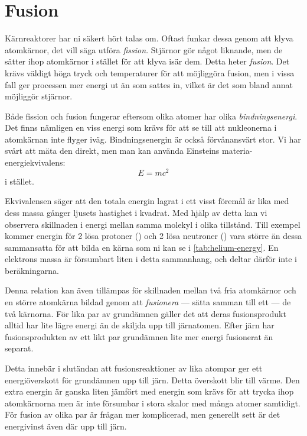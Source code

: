 \section{Fusion}
Kärnreaktorer har ni säkert hört talas om. Oftast funkar dessa genom att klyva atomkärnor, det vill säga utföra \emph{fission}. Stjärnor gör något liknande, men de sätter ihop atomkärnor i stället för att klyva isär dem. Detta heter \emph{fusion}. Det krävs väldigt höga tryck och temperaturer för att möjliggöra fusion, men i vissa fall ger processen mer energi ut än som sattes in, vilket är det som bland annat möjliggör stjärnor.

Både fission och fusion fungerar eftersom olika atomer har olika \emph{bindningsenergi}. Det finns nämligen en viss energi som krävs för att se till att nukleonerna i atomkärnan inte flyger iväg. Bindningsenergin är också förvånansvärt stor. Vi har svårt att mäta den direkt, men man kan använda Einsteins materia-energiekvivalens:
\begin{equation}
    E = mc^2
    \label{eq:emc2}
\end{equation}
i stället.

Ekvivalensen säger att den totala energin lagrat i ett visst föremål är lika med dess massa gånger ljusets hastighet i kvadrat. Med hjälp av detta kan vi observera skillnaden i energi mellan samma molekyl i olika tillstånd. Till exempel kommer energin för 2 lösa protoner () och 2 lösa neutroner () vara större än dessa sammansatta för att bilda en  kärna som ni kan se i \cref{tab:helium-energy}. En elektrons massa är försumbart liten i detta sammanhang, och deltar därför inte i beräkningarna.

Denna relation kan även tillämpas för skillnaden mellan två fria atomkärnor och en större atomkärna bildad genom att \emph{fusionera} --- sätta samman till ett --- de två kärnorna. För lika par av grundämnen gäller det att deras fusionsprodukt alltid har lite lägre energi än de skiljda upp till järnatomen. Efter järn har fusionsprodukten av ett likt par grundämnen lite mer energi fusionerat än separat.

Detta innebär i slutändan att fusionsreaktioner av lika atompar ger ett energiöverskott för grundämnen upp till järn. Detta överskott blir till värme. Den extra energin är ganska liten jämfört med energin som krävs för att trycka ihop atomkärnorna men är inte försumbar i stora skalor med många atomer samtidigt. För fusion av olika par är frågan mer komplicerad, men generellt sett är det energivinst även där upp till järn.

